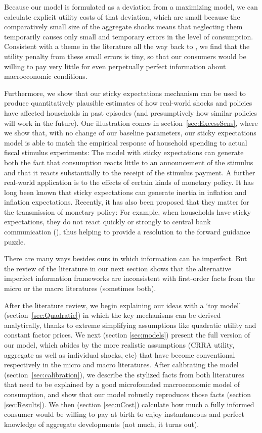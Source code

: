\documentclass[titlepage]{./econtex}
\begin{document}
Because our model is formulated as a deviation from a maximizing model, we can calculate explicit utility costs of that deviation, which are small because the comparatively small size of the aggregate shocks means that neglecting them temporarily causes only small and temporary errors in the level of consumption.  Consistent with a theme in the literature all the way back to \cite{ayNearRational}, we find that the utility penalty from these small errors is tiny, so that our consumers would be willing to pay very little for even perpetually perfect information about macroeconomic conditions.

Furthermore, we show that our sticky expectations mechanism can be used to produce quantitatively plausible estimates of how real-world shocks and policies have affected households in past episodes (and presumptively how similar policies will work in the future).  One illustration comes in section~\ref{sec:ExcessSens}, where we show that, with no change of our baseline parameters, our sticky expectations model is able to match the empirical response of household spending to actual fiscal stimulus experiments: The model with sticky expectations can generate both the fact that consumption reacts little to an announcement of the stimulus and that it reacts substantially to the receipt of the stimulus payment.  A further real-world application is to the effects of certain kinds of monetary policy. It has long been known that sticky expectations can generate inertia in inflation and inflation expectations. Recently, it has also been proposed that they matter for the transmission of monetary policy: For example, when households have sticky expectations, they do not react quickly or strongly to central bank communication (\cite{arsInvestmentInattention}), thus helping to provide a resolution to the forward guidance puzzle.

There are many ways besides ours in which information can be imperfect.  But the review of the literature in our next section shows that the alternative imperfect information frameworks are inconsistent with first-order facts from the micro or the macro literatures (sometimes both).

After the literature review, we begin explaining our ideas with a `toy model' (section~\ref{sec:Quadratic}) in which the key mechanisms can be derived analytically, thanks to extreme simplifying assumptions like quadratic utility and constant factor prices.  We next (section \ref{sec:models}) present the full version of our model, which abides by the more realistic assumptions (CRRA utility, aggregate as well as individual shocks, etc) that have become conventional respectively in the micro and macro literatures. After calibrating the model (section~\ref{sec:calibration}), we describe the stylized facts from both literatures that need to be explained by a good microfounded macroeconomic model of consumption, and show that our model robustly reproduces those facts (section \ref{sec:Results}).
We then (section \ref{sec:uCost}) calculate how much a fully informed consumer would be willing to pay at birth to enjoy instantaneous and perfect knowledge of aggregate developments (not much, it turns out).
\end{document}
